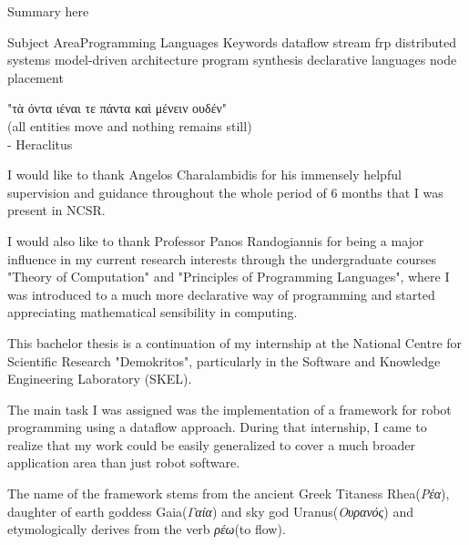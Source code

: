 \documentclass{dithesis}
\begin{document}


\maketitle

\begin{thesisabstract}[Abstract]
Summary here

\thesiskeywords
{Subject Area}{Programming Languages}
{Keywords}
	{dataflow}
	{stream}
	{frp}
	{distributed systems}
	{model-driven architecture}
	{program synthesis}
	{declarative languages}
	{node placement}
\end{thesisabstract}

\begin{thesisdedication}
"τὰ όντα ιέναι τε πάντα καὶ μένειν ουδέν" \\
(all entities move and nothing remains still) \\
- Heraclitus
\end{thesisdedication}

\begin{thesisacknowledgments}[Acknowledgements]

I would like to thank Angelos Charalambidis for his immensely helpful supervision and guidance throughout the whole period of 6 months that I was present in NCSR. 

I would also like to thank Professor Panos Randogiannis for being a major influence in my current research interests through the undergraduate courses "Theory of Computation" and "Principles of Programming Languages", where I was introduced to a much more declarative way of programming and started appreciating mathematical sensibility in computing.

\end{thesisacknowledgments}

\tableofcontents
\listoffigures

\begin{thesisprologue}[Prologue]

This bachelor thesis is a continuation of my internship at the National Centre for Scientific Research "Demokritos", particularly in the Software and Knowledge Engineering Laboratory (SKEL). 

The main task I was assigned was the implementation of a framework for robot programming using a dataflow approach. During that internship, I came to realize that my work could be easily generalized to cover a much broader application area than just robot software. 

The name of the framework stems from the ancient Greek Titaness Rhea(\textit{Ρέα}), daughter of earth goddess Gaia(\textit{Γαία}) and sky god Uranus(\textit{Ουρανός}) and etymologically derives from the verb \textit{ρέω}(to flow).

\end{thesisprologue}
\end{document}
